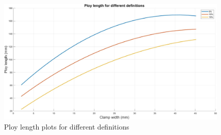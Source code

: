 \begin{figure}[!hbt]
    \centering
    \includegraphics[width=15cm]{images/ploylen_def.jpg}
    \caption{Ploy length plots for different definitions}
    \label{fig:ploydef}
\end{figure}
